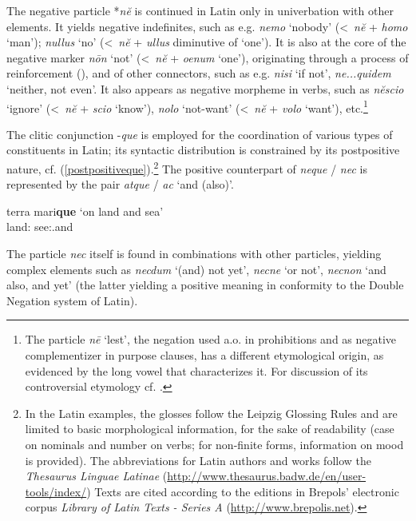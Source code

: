 \documentclass[output=paper,modfonts,nonflat,citecolor=brown,
showindex
]{langsci/langscibook}
\begin{document}
The negative particle *{\em{n\u{e}}} is continued in Latin only in univerbation with other elements. It yields negative indefinites, such as e.g. {\em{nemo}} `nobody' (\textless \ {\em{n\u{e}}} + {\em{homo}} `man'); {\em{nullus}} `no' (\textless \ {\em{n\u{e}}} + {\em{ullus}} diminutive of `one'). It is also at the core of the negative marker {\em{n\=on}} `not' (\textless \ {\em{n\u{e}}} + {\em{oenum}} `one'), originating through a process of reinforcement (\citealt[]{Fruyt08a, Gianollo18}), and of other connectors, such as e.g. {\em{nisi}} `if not', {\em{ne...quidem}} `neither, not even'. It also appears as negative morpheme in verbs, such as {\em{n\u{e}scio}} `ignore' (\textless \ {\em{n\u{e}}} + {\em{scio}} `know'), {\em{nolo}} `not-want' (\textless \ {\em{n\u{e}}} + {\em{volo}} `want'), etc.{\footnote{The particle {\em{n\=e}} `lest', the negation used a.o. in prohibitions and as negative complementizer in purpose clauses, has a different etymological origin, as evidenced by the long vowel that characterizes it. For discussion of its controversial etymology cf. \citet{deVaan}.}}

The clitic conjunction -{\em{que}} is employed for the coordination of various types of constituents in Latin; its syntactic distribution is constrained by its postpositive nature, cf. (\ref{postpositiveque}).{\footnote{In the Latin examples, the glosses follow the Leipzig Glossing Rules and are limited to basic morphological information, for the sake of readability (case on nominals and number on verbs; for non-finite forms, information on mood is provided). The abbreviations for Latin authors and works follow the {\em{Thesaurus Linguae Latinae}} (\url{http://www.thesaurus.badw.de/en/user-tools/index/}) Texts are cited according to the editions in Brepols' electronic corpus {\em{Library of Latin Texts - Series A}} (\url{http://www.brepolis.net}).}} The positive counterpart of {\em{neque}} / {\em{nec}} is represented by the pair {\em{atque}} / {\em{ac}} `and (also)'.

{\begin{exe}
\ex \label{postpositiveque} \gll terra mari{\bf{que}} \hfill `on land and sea'\\
land:{} see:{}.and\\
\end{exe}}

\noindent The particle {\em{nec}} itself is found in combinations with other particles, yielding complex elements such as {\em{necdum}} `(and) not yet', {\em{necne}} `or not', {\em{necnon}} `and also, and yet' (the latter yielding a positive meaning in conformity to the Double Negation system of Latin).
\end{document}
